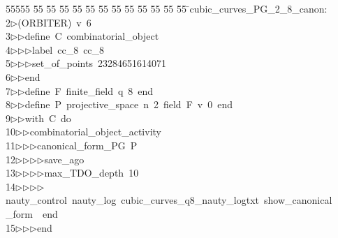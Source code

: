 %
%
\begin{tabbing}
55555 \= 55 \= 55 \= 55 \= 55 \= 55 \= 55 \= 55 \= 55 \= 55 \= 55 \= 55 \= 55 \= \>cubic\_curves\_PG\_2\_8\_canon:\\[0pt]
2\>$\triangleright$\>(ORBITER)\ v\ 6\ \\[0pt]
3\>$\triangleright$\>$\triangleright$\>define\ C\ combinatorial\_object\ \\[0pt]
4\>$\triangleright$\>$\triangleright$\>$\triangleright$\>label\ cc\_8\ cc\_8\ \\[0pt]
5\>$\triangleright$\>$\triangleright$\>$\triangleright$\>set\_of\_points\ 23284651614071\ \\[0pt]
6\>$\triangleright$\>$\triangleright$\>end\ \\[0pt]
7\>$\triangleright$\>$\triangleright$\>define\ F\ finite\_field\ q\ 8\ end\ \\[0pt]
8\>$\triangleright$\>$\triangleright$\>define\ P\ projective\_space\ n\ 2\ field\ F\ v\ 0\ end\ \\[0pt]
9\>$\triangleright$\>$\triangleright$\>with\ C\ do\ \\[0pt]
10\>$\triangleright$\>$\triangleright$\>combinatorial\_object\_activity\ \\[0pt]
11\>$\triangleright$\>$\triangleright$\>$\triangleright$\>canonical\_form\_PG\ P\ \\[0pt]
12\>$\triangleright$\>$\triangleright$\>$\triangleright$\>$\triangleright$\>save\_ago\ \\[0pt]
13\>$\triangleright$\>$\triangleright$\>$\triangleright$\>$\triangleright$\>max\_TDO\_depth\ 10\ \\[0pt]
14\>$\triangleright$\>$\triangleright$\>$\triangleright$\>$\triangleright$\>nauty\_control\ nauty\_log\ cubic\_curves\_q8\_nauty\_logtxt\ show\_canonical\\[0pt]
\>\_form\ \ end\ \\[0pt]
15\>$\triangleright$\>$\triangleright$\>$\triangleright$\>end\ \\[0pt]

\end{tabbing}
